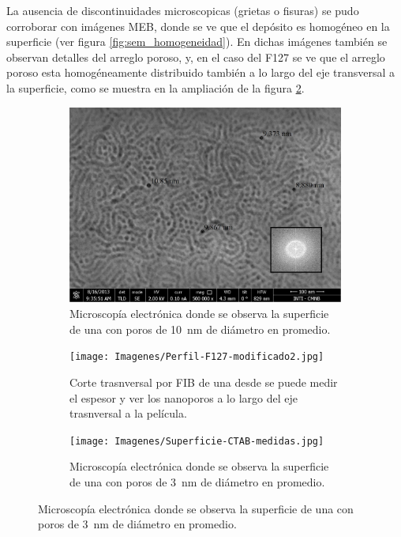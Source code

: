 		La ausencia de discontinuidades microscopicas (grietas o fisuras) se pudo corroborar con imágenes MEB, donde se ve que el depósito es homogéneo en la superficie (ver figura \ref{fig:sem_homogeneidad}). En dichas imágenes también se observan detalles del arreglo poroso, y, en el caso del F127 se ve que el arreglo poroso esta homogéneamente distribuido también a lo largo del eje transversal a la superficie, como se muestra en la ampliación de la figura \ref{fig:sem_homogeneidad2}.

			\begin{figure}[th]
		 	   	    \begin{subfigure}[t]{0.49\textwidth}
			        	\includegraphics[width=\textwidth]{Imagenes/Superficie-F127-medidas.jpg}
			       		\caption{Microscopía electrónica donde se observa la superficie de una \pdmF\space con poros de \SI{10}{nm} de diámetro en promedio.}
			       		\label{fig:sem_homogeneidad1}
			       		\end{subfigure}
					\begin{subfigure}[t]{0.49\textwidth}
			 	   	    \texttt{[image: Imagenes/Perfil-F127-modificado2.jpg]}
			       		\caption{Corte trasnversal por FIB de una \pdmF\space desde se puede medir el espesor y ver los nanoporos a lo largo del eje trasnversal a la película.}
			       		\label{fig:sem_homogeneidad2}
			       		\end{subfigure}
			       	\begin{subfigure}[t]{0.49\textwidth}
			        	\texttt{[image: Imagenes/Superficie-CTAB-medidas.jpg]}
			       		\caption{Microscopía electrónica donde se observa la superficie de una \pdmF\space con poros de \SI{3}{nm} de diámetro en promedio.}

\end{subfigure}
\end{figure}
